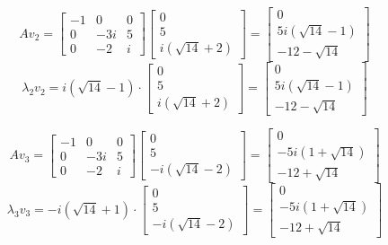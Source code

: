 \documentclass{article}
\begin{document}
\[
    Av_2 = 
    \begin{bmatrix}
-1 & 0 & 0 \\
0 & -3i & 5 \\
0 & -2 & i
\end{bmatrix}
\begin{bmatrix}
    0 \\ 5 \\ i(\sqrt{14}+2)
\end{bmatrix}
= 
\begin{bmatrix}
    0 \\ 5i(\sqrt{14}-1) \\ -12-\sqrt{14}
\end{bmatrix}
\]
\[
    \lambda_2 v_2 = 
i(\sqrt{14}-1) \cdot
\begin{bmatrix}
    0 \\ 5 \\ i(\sqrt{14}+2)
\end{bmatrix}
= 
\begin{bmatrix}
    0 \\ 5i(\sqrt{14}-1) \\ -12-\sqrt{14}
\end{bmatrix}
\]

\[
    Av_3 = 
    \begin{bmatrix}
-1 & 0 & 0 \\
0 & -3i & 5 \\
0 & -2 & i
\end{bmatrix}
\begin{bmatrix}
    0 \\ 5 \\ -i(\sqrt{14}-2)
\end{bmatrix}
= 
\begin{bmatrix}
    0 \\ -5i(1+\sqrt{14}) \\ -12+\sqrt{14}
\end{bmatrix}
\]
\[
    \lambda_3 v_3 = 
-i(\sqrt{14}+1) \cdot
\begin{bmatrix}
    0 \\ 5 \\ -i(\sqrt{14}-2)
\end{bmatrix}
= 
\begin{bmatrix}
    0 \\ -5i(1+\sqrt{14}) \\ -12+\sqrt{14}
\end{bmatrix}
\]
\end{document}
